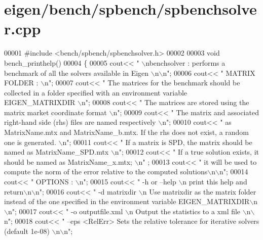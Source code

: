 \hypertarget{eigen_2bench_2spbench_2spbenchsolver_8cpp_source}{}\section{eigen/bench/spbench/spbenchsolver.cpp}
\label{eigen_2bench_2spbench_2spbenchsolver_8cpp_source}

\begin{DoxyCode}
00001 \textcolor{preprocessor}{#include <bench/spbench/spbenchsolver.h>}
00002 
00003 \textcolor{keywordtype}{void} bench\_printhelp()
00004 \{
00005     cout<< \textcolor{stringliteral}{" \(\backslash\)nbenchsolver : performs a benchmark of all the solvers available in Eigen \(\backslash\)n\(\backslash\)n"};
00006     cout<< \textcolor{stringliteral}{" MATRIX FOLDER : \(\backslash\)n"};
00007     cout<< \textcolor{stringliteral}{" The matrices for the benchmark should be collected in a folder specified with an environment
       variable EIGEN\_MATRIXDIR \(\backslash\)n"};
00008     cout<< \textcolor{stringliteral}{" The matrices are stored using the matrix market coordinate format \(\backslash\)n"};
00009     cout<< \textcolor{stringliteral}{" The matrix and associated right-hand side (rhs) files are named respectively \(\backslash\)n"};
00010     cout<< \textcolor{stringliteral}{" as MatrixName.mtx and MatrixName\_b.mtx. If the rhs does not exist, a random one is generated. 
      \(\backslash\)n"};
00011     cout<< \textcolor{stringliteral}{" If a matrix is SPD, the matrix should be named as MatrixName\_SPD.mtx \(\backslash\)n"};
00012     cout<< \textcolor{stringliteral}{" If a true solution exists, it should be named as MatrixName\_x.mtx; \(\backslash\)n"}     ;
00013     cout<< \textcolor{stringliteral}{" it will be used to compute the norm of the error relative to the computed solutions\(\backslash\)n\(\backslash\)n"};
00014     cout<< \textcolor{stringliteral}{" OPTIONS : \(\backslash\)n"}; 
00015     cout<< \textcolor{stringliteral}{" -h or --help \(\backslash\)n    print this help and return\(\backslash\)n\(\backslash\)n"};
00016     cout<< \textcolor{stringliteral}{" -d matrixdir \(\backslash\)n    Use matrixdir as the matrix folder instead of the one specified in the
       environment variable EIGEN\_MATRIXDIR\(\backslash\)n\(\backslash\)n"}; 
00017     cout<< \textcolor{stringliteral}{" -o outputfile.xml \(\backslash\)n    Output the statistics to a xml file \(\backslash\)n\(\backslash\)n"};
00018     cout<< \textcolor{stringliteral}{" --eps <RelErr> Sets the relative tolerance for iterative solvers (default 1e-08) \(\backslash\)n\(\backslash\)n"};

\end{DoxyCode}
